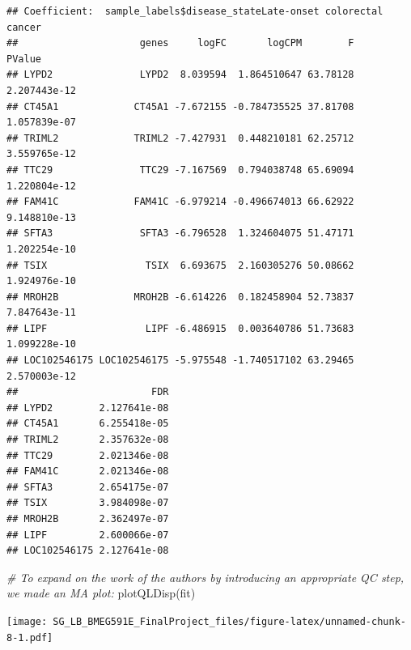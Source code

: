\documentclass[
]{article}
\newenvironment{Shaded}{\begin{snugshade}}{\end{snugshade}}
\newcommand{\CommentTok}[1]{\textcolor[rgb]{0.56,0.35,0.01}{\textit{#1}}}
\newcommand{\FunctionTok}[1]{\textcolor[rgb]{0.00,0.00,0.00}{#1}}
\newcommand{\NormalTok}[1]{#1}
\begin{document}
\begin{verbatim}
## Coefficient:  sample_labels$disease_stateLate-onset colorectal cancer 
##                     genes     logFC       logCPM        F       PValue
## LYPD2               LYPD2  8.039594  1.864510647 63.78128 2.207443e-12
## CT45A1             CT45A1 -7.672155 -0.784735525 37.81708 1.057839e-07
## TRIML2             TRIML2 -7.427931  0.448210181 62.25712 3.559765e-12
## TTC29               TTC29 -7.167569  0.794038748 65.69094 1.220804e-12
## FAM41C             FAM41C -6.979214 -0.496674013 66.62922 9.148810e-13
## SFTA3               SFTA3 -6.796528  1.324604075 51.47171 1.202254e-10
## TSIX                 TSIX  6.693675  2.160305276 50.08662 1.924976e-10
## MROH2B             MROH2B -6.614226  0.182458904 52.73837 7.847643e-11
## LIPF                 LIPF -6.486915  0.003640786 51.73683 1.099228e-10
## LOC102546175 LOC102546175 -5.975548 -1.740517102 63.29465 2.570003e-12
##                       FDR
## LYPD2        2.127641e-08
## CT45A1       6.255418e-05
## TRIML2       2.357632e-08
## TTC29        2.021346e-08
## FAM41C       2.021346e-08
## SFTA3        2.654175e-07
## TSIX         3.984098e-07
## MROH2B       2.362497e-07
## LIPF         2.600066e-07
## LOC102546175 2.127641e-08
\end{verbatim}

\begin{Shaded}
\begin{Highlighting}[]
\CommentTok{\# To expand on the work of the authors by introducing an appropriate QC step, we made an MA plot:}
\FunctionTok{plotQLDisp}\NormalTok{(fit)}
\end{Highlighting}
\end{Shaded}

\texttt{[image: SG\_LB\_BMEG591E\_FinalProject\_files/figure-latex/unnamed-chunk-8-1.pdf]}
\end{document}
